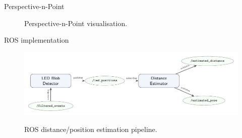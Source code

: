\documentclass{beamer}
\begin{document}
\begin{frame}{Perspective-n-Point}

\begin{figure}[H]
    \centering
    \hspace{1em}%
    \label{fig:pnp}
    \caption{Perspective-n-Point visualisation.}
\end{figure}



\end{frame}

\begin{frame}{ROS implementation}

    \begin{figure}
        \centering
        \includegraphics[width=1.0\textwidth]{../fig/tikz/rosflow.pdf}
        \label{fig:ros}
        \caption{ROS distance/position estimation pipeline.}
    \end{figure}

\end{frame}
\end{document}
